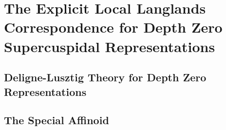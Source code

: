 \documentclass[../main.tex]{subfiles}
\begin{document}
\section{The Explicit Local Langlands Correspondence for Depth Zero Supercuspidal Representations} %
\label{sec:The Explicit Local Langlands Correspondence for Depth Zero Supercuspidal Representations}


\subsection{Deligne-Lusztig Theory for Depth Zero Representations} %
\label{sub:Deligne-Lusztig Theory for Depth Zero Representations}
\begin{defi}\label{def:DLVariety}
  \todo{}
\end{defi}

\begin{defi}\label{def:DLCorrespondence}
  \todo{}
\end{defi}




\subsection{The Special Affinoid} %
\label{sub:The Special Affinoid}
\begin{defi}
  \todo{}
\end{defi}

\end{document}
